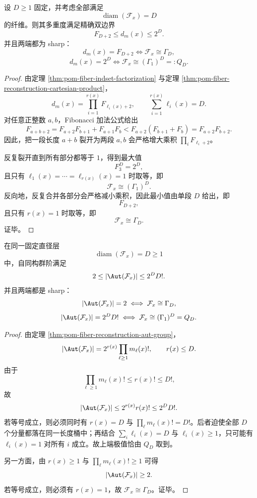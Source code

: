 \begin{theorem}[固定直径层上的纤维多重度双端极值]\label{thm:conclusion-fiber-fixed-diameter-multiplicity-extremals}
设 \(D\ge 1\) 固定，并考虑全部满足
\[
\operatorname{diam}(\mathcal F_x)=D
\]
的纤维。则其多重度满足精确双边界
\[
F_{D+2}\le d_m(x)\le 2^D.
\]
并且两端都为 sharp：
\[
d_m(x)=F_{D+2}
\iff
\mathcal F_x\cong \Gamma_D,
\]
\[
d_m(x)=2^D
\iff
\mathcal F_x\cong (\Gamma_1)^D=:Q_D.
\]
\end{theorem}
\begin{proof}
由定理 \ref{thm:pom-fiber-indset-factorization} 与定理 \ref{thm:pom-fiber-reconstruction-cartesian-product}，
\[
d_m(x)=\prod_{i=1}^{r(x)}F_{\ell_i(x)+2},
\qquad
\sum_{i=1}^{r(x)}\ell_i(x)=D.
\]
对任意正整数 \(a,b\)，Fibonacci 加法公式给出
\[
F_{a+b+2}=F_{a+2}F_{b+1}+F_{a+1}F_b
<
F_{a+2}(F_{b+1}+F_b)
=
F_{a+2}F_{b+2}.
\]
因此，把一段长度 \(a+b\) 裂开为两段 \(a,b\) 会严格增大乘积 \(\prod_i F_{\ell_i+2}\)。

反复裂开直到所有部分都等于 \(1\)，得到最大值
\[
F_3^D=2^D,
\]
且只有 \(\ell_1(x)=\cdots=\ell_{r(x)}(x)=1\) 时取等，即
\[
\mathcal F_x\cong (\Gamma_1)^D.
\]
反向地，反复合并各部分会严格减小乘积，因此最小值由单段 \(D\) 给出，即
\[
F_{D+2},
\]
且只有 \(r(x)=1\) 时取等，即
\[
\mathcal F_x\cong \Gamma_D.
\]
证毕。
\end{proof}

\begin{theorem}[固定直径层上的对称性双端极值]\label{thm:conclusion-fiber-fixed-diameter-symmetry-extremals}
在同一固定直径层
\[
\operatorname{diam}(\mathcal F_x)=D\ge 1
\]
中，自同构群阶满足
\[
2\le |\Aut(\mathcal F_x)|\le 2^D D!.
\]
并且两端都是 sharp：
\[
|\Aut(\mathcal F_x)|=2
\iff
\mathcal F_x\cong \Gamma_D,
\]
\[
|\Aut(\mathcal F_x)|=2^D D!
\iff
\mathcal F_x\cong (\Gamma_1)^D=Q_D.
\]
\end{theorem}
\begin{proof}
由定理 \ref{thm:pom-fiber-reconstruction-aut-group}，
\[
|\Aut(\mathcal F_x)|=2^{r(x)}\prod_{\ell\ge 1}m_\ell(x)!,
\qquad
r(x)\le D.
\]
由于
\[
\prod_{\ell\ge 1}m_\ell(x)!\le r(x)!\le D!,
\]
故
\[
|\Aut(\mathcal F_x)|\le 2^{r(x)}r(x)!\le 2^D D!.
\]
若等号成立，则必须同时有 \(r(x)=D\) 与 \(\prod_\ell m_\ell(x)!=D!\)。后者迫使全部 \(D\) 个分量都落在同一长度桶中；再结合 \(\sum_i \ell_i(x)=D\) 与 \(\ell_i(x)\ge 1\)，只可能有 \(\ell_i(x)=1\) 对所有 \(i\) 成立。故上端极值恰由 \(Q_D\) 取到。

另一方面，由 \(r(x)\ge 1\) 与 \(\prod_\ell m_\ell(x)!\ge 1\) 可得
\[
|\Aut(\mathcal F_x)|\ge 2.
\]
若等号成立，则必须有 \(r(x)=1\)，故 \(\mathcal F_x\cong\Gamma_D\)。证毕。
\end{proof}

